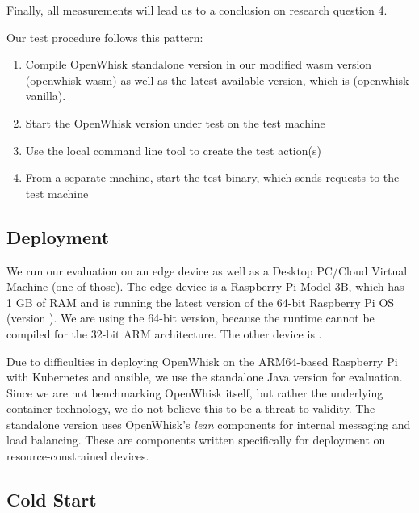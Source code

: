 Finally, all measurements will lead us to a conclusion on research question 4.

Our test procedure follows this pattern:

\begin{enumerate}
    \item Compile OpenWhisk standalone version in our modified wasm version (openwhisk-wasm) as well as the latest available version, which is  (openwhisk-vanilla).
    \item Start the OpenWhisk version under test on the test machine
    \item Use the local  command line tool to create the test action(s)
    \item From a separate machine, start the test binary, which sends requests to the test machine
\end{enumerate}

\subsection{Deployment}

We run our evaluation on an edge device as well as a Desktop PC/Cloud Virtual Machine (one of those). The edge device is a Raspberry Pi Model 3B, which has 1 GB of RAM and is running the latest version of the 64-bit Raspberry Pi OS (version ). We are using the 64-bit version, because the  runtime cannot be compiled for the 32-bit ARM architecture. The other device is .

Due to difficulties in deploying OpenWhisk on the ARM64-based Raspberry Pi with Kubernetes and ansible, we use the standalone Java version for evaluation. Since we are not benchmarking OpenWhisk itself, but rather the underlying container technology, we do not believe this to be a threat to validity. The standalone version uses OpenWhisk's \emph{lean} components for internal messaging and load balancing. These are components written specifically for deployment on resource-constrained devices.


\subsection{Cold Start}

\begin{figure}
    \begin{center}
        
    \end{center}
    \caption{}
    \label{fig:pi-cold-start-initTime}
\end{figure}

